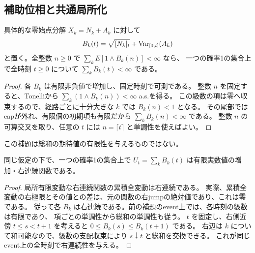 \subsection{補助位相と共通局所化}

\begin{lemma}[capped級数からの経路的有限性]
具体的な零始点分解 $X_k=N_k+A_k$ に対して
\[
 B_k(t)=\sqrt{[N_k]_t}+\operatorname{Var}_{[0,t]}(A_k)
\]
と置く。全整数 $n\ge0$ で $\sum_k E[1\wedge B_k(n)]<\infty$ なら、
一つの確率1の集合上で全時刻 $t\ge0$ について $\sum_k B_k(t)<\infty$ である。
\end{lemma}
\begin{proof}
各 $B_k$ は有限非負値で増加し、固定時刻で可測である。
整数 $n$ を固定すると、Tonelliから $\sum_k(1\wedge B_k(n))<\infty$ a.s.を得る。
この級数の項は零へ収束するので、経路ごとに十分大きな $k$ では $B_k(n)<1$ となる。
その尾部ではcapが外れ、有限個の初期項も有限だから $\sum_k B_k(n)<\infty$ である。
整数 $n$ の可算交叉を取り、任意の $t$ には $n=\lceil t\rceil$ と単調性を使えばよい。
\end{proof}
この補題は総和の期待値の有限性を与えるものではない。

\begin{lemma}[総和の単調性と右連続性]
同じ仮定の下で、一つの確率1の集合上で
$U_t=\sum_k B_k(t)$ は有限実数値の増加・右連続関数である。
\end{lemma}
\begin{proof}
局所有限変動な右連続関数の累積全変動は右連続である。
実際、累積全変動の右極限とその値との差は、元の関数の右jumpの絶対値であり、これは零である。
従って各 $B_k$ は右連続である。前の補題のevent上では、各時刻の級数は有限であり、
項ごとの単調性から総和の単調性も従う。
$t$ を固定し、右側近傍 $t\le s<t+1$ を考えると $0\le B_k(s)\le B_k(t+1)$ である。
右辺は $k$ について和可能なので、級数の支配収束により $s\downarrow t$ と総和を交換できる。
これが同じevent上の全時刻で右連続性を与える。
\end{proof}

